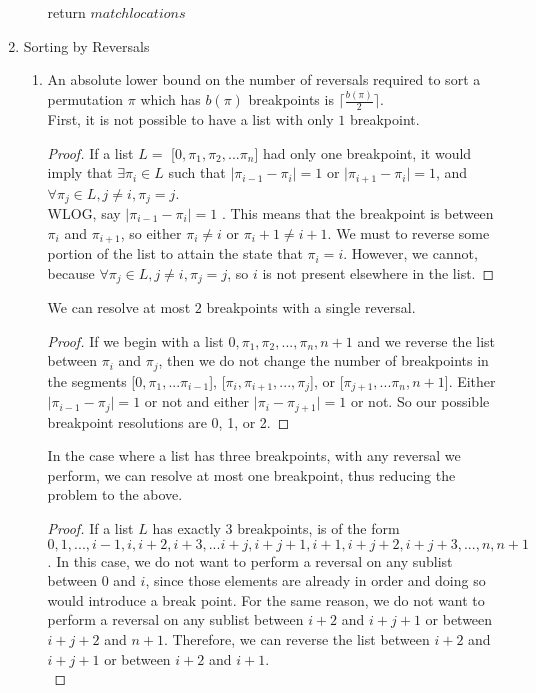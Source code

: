 \documentclass[a4paper]{article}
\begin{document}
\begin{enumerate}
\begin{enumerate}
\begin{algorithmic}
		\State return $matchlocations$
		\end{algorithmic}
	\end{enumerate}
\item Sorting by Reversals
	\begin{enumerate}
	\item An absolute lower bound on the number of reversals required to sort a permutation $\pi$ which has $b(\pi)$ breakpoints is $\lceil \frac{b(\pi)}{2} \rceil$.\\
	First, it is not possible to have a list with only $1$ breakpoint.
	\begin{proof}
	If a list $L =$ [$0, \pi_1, \pi_2, ... \pi_n$] had only one breakpoint, it would imply that $\exists \pi_i \in L$ such that $\lvert \pi_{i-1} - \pi_i \rvert = 1$ or $\lvert \pi_{i+1} - \pi_i \rvert = 1$, and $\forall \pi_j \in L, j \neq i, \pi_j = j$.\\
	WLOG, say $\lvert \pi_{i-1} - \pi_i \rvert = 1$ .  This means that the breakpoint is between $\pi_i$ and $\pi_{i+1}$, so either $\pi_i \neq i$ or $\pi_i+1 \neq i+1$.  We must to reverse some portion of the list to attain the state that $\pi_i = i$.  However, we cannot, because $\forall \pi_j \in L, j \neq i, \pi_j = j$, so $i$ is not present elsewhere in the list.
	\end{proof}
	We can resolve at most $2$ breakpoints with a single reversal.
	\begin{proof}
	If we begin with a list $0, \pi_1, \pi_2, ... , \pi_n, n+1$ and we reverse the list between $\pi_i$ and $\pi_j$, then we do not change the number of breakpoints in the segments [$0, \pi_1, ... \pi_{i-1}$], [$\pi_i, \pi_{i+1}, ... , \pi_j$], or [$\pi_{j+1}, ... \pi_n, n+1$].  Either $\rvert \pi_{i-1} - \pi_j \lvert = 1$ or not and either $\rvert \pi_i - \pi_{j+1} \lvert = 1$ or not.  So our possible breakpoint resolutions are 0, 1, or 2.
	\end{proof}
	In the case where a list has three breakpoints, with any reversal we perform, we can resolve at most one breakpoint, thus reducing the problem to the above.
	\begin{proof}
	If a list $L$ has exactly $3$ breakpoints, is of the form $0, 1, ...,i-1, i, i+2, i+3, ... i+j, i+j+1, i+1, i+j+2, i+j+3, ..., n, n+1$.  In this case, we do not want to perform a reversal on any sublist between $0$ and $i$, since those elements are already in order and doing so would introduce a break point.  For the same reason, we do not want to perform a reversal on any sublist between $i+2$ and $i+j+1$ or between $i+j+2$ and $n+1$.  Therefore, we can reverse the list between $i+2$ and $i+j+1$ or between $i+2$ and $i+1$.\\

\end{proof}
\end{enumerate}
\end{enumerate}
\end{document}
